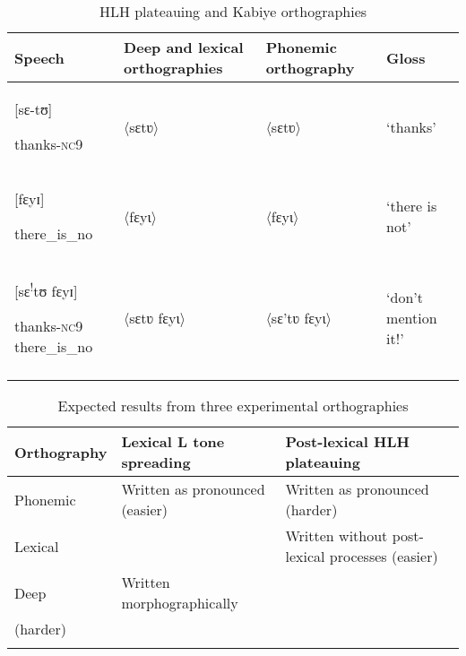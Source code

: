 \documentclass[output=paper]{langscibook}
\begin{document}



\begin{table}[p]
    \begin{tabularx}{\textwidth}{QQQl}
    \lsptoprule
    Speech & Deep and lexical orthographies & Phonemic orthography & Gloss\\\midrule
    {[sɛ-tʊ]} 

    thanks-\textsc{nc9} & 〈sɛtʋ〉 & 〈sɛtʋ〉 & ‘thanks’\\
    {[fɛyɪ]}

    there\_is\_no & 〈fɛyɩ〉 & 〈fɛyɩ〉 & ‘there is not’\\
    {[sɛ\textsuperscript{!}tʊ fɛyɪ]}

    thanks-\textsc{nc9} there\_is\_no & 〈sɛtʋ fɛyɩ〉 & 〈sɛ’tʋ fɛyɩ〉 & ‘don’t mention it!’\\
    \lspbottomrule
    \end{tabularx}
    \caption{HLH plateauing and Kabiye orthographies}
    \label{tab:cahill:20}
\end{table}

\begin{table}[p]
    \begin{tabularx}{\textwidth}{llQ}
    \lsptoprule

    Orthography & Lexical L tone spreading & Post-lexical HLH plateauing\\\midrule
    Phonemic & {Written as pronounced}     (easier) & {Written as pronounced}    (harder)\\\tablevspace
    {Lexical} &  & {Written without post-lexical processes} (easier)\\\tablevspace
    {Deep}  & Written morphographically \\  (harder) & \\
    \lspbottomrule
    \end{tabularx}
    \caption{Expected results from three experimental orthographies}
    \label{tab:cahill:21}
\end{table}
\end{document}
